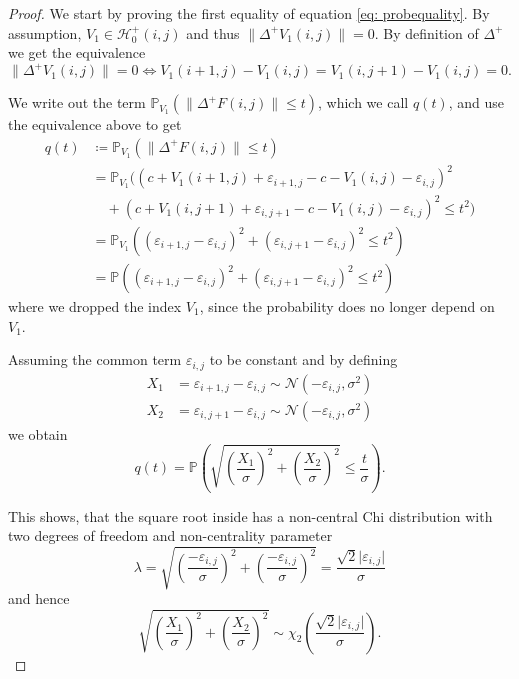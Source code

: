 \documentclass[a4paper,12pt]{article}
\newcommand{\abs}[1]{\lvert#1\rvert}
\newcommand{\norm}[1]{\lVert#1\rVert}
\theoremstyle{plain}
\theoremstyle{definition}
\begin{document}
\begin{proof}
	We start by proving the first equality of equation \eqref{eq: probequality}. By assumption, $V_1 \in \mathcal{H}_0^+(i, j)$ and thus $\norm{\Delta^+ V_1(i, j)} = 0$. By definition of $\Delta^+$ we get the equivalence
	\begin{equation*}
		\norm{\Delta^+ V_1(i, j)} = 0 \Leftrightarrow V_1(i + 1, j) - V_1(i, j) = V_1(i, j + 1) - V_1(i, j) = 0.
	\end{equation*}
	
	We write out the term $\mathbb{P}_{V_1}( \norm{\Delta^+ F(i, j)} \leq t )$, which we call $q(t)$, and use the equivalence above to get
	\begin{align*}
		q(t) &\coloneqq \mathbb{P}_{V_1}( \norm{\Delta^+ F(i, j)} \leq t ) \\
		&= \mathbb{P}_{V_1}\big( (c + V_1(i + 1, j) + \varepsilon_{i + 1, j} - c - V_1(i, j) - \varepsilon_{i, j})^2 \\
		&\quad + (c + V_1(i, j + 1) + \varepsilon_{i, j + 1} - c - V_1(i, j) - \varepsilon_{i, j})^2 \leq t^2 \big) \\
		&= \mathbb{P}_{V_1}\left( (\varepsilon_{i + 1, j} - \varepsilon_{i, j})^2 + (\varepsilon_{i, j + 1} - \varepsilon_{i, j})^2 \leq t^2 \right) \\
		&= \mathbb{P}\left( (\varepsilon_{i + 1, j} - \varepsilon_{i, j})^2 + (\varepsilon_{i, j + 1} - \varepsilon_{i, j})^2 \leq t^2 \right)
	\end{align*}
	where we dropped the index $V_1$, since the probability does no longer depend on $V_1$.
	
	Assuming the common term $\varepsilon_{i, j}$ to be constant and by defining
	\begin{align*}
		X_1 &= \varepsilon_{i + 1, j} - \varepsilon_{i, j} \sim \mathcal{N}(- \varepsilon_{i, j}, \sigma^2) \\
		X_2 &= \varepsilon_{i, j + 1} - \varepsilon_{i, j} \sim \mathcal{N}(- \varepsilon_{i, j}, \sigma^2)
	\end{align*}
	we obtain
	\begin{equation*}
		q(t) = \mathbb{P}\left( \sqrt{\left( \frac{X_1}{\sigma} \right)^2 + \left( \frac{X_2}{\sigma} \right)^2} \leq \frac{t}{\sigma} \right).
	\end{equation*}
	
	This shows, that the square root inside has a non-central Chi distribution with two degrees of freedom and non-centrality parameter
	\begin{equation*}
		\lambda = \sqrt{\left( \frac{- \varepsilon_{i, j}}{\sigma} \right)^2 + \left( \frac{- \varepsilon_{i, j}}{\sigma} \right)^2} = \frac{\sqrt{2} \abs{\varepsilon_{i, j}}}{\sigma}
	\end{equation*}
	and hence
	\begin{equation*}
		\sqrt{\left( \frac{X_1}{\sigma} \right)^2 + \left( \frac{X_2}{\sigma} \right)^2} \sim \chi_2 \left( \frac{\sqrt{2} \abs{\varepsilon_{i, j}}}{\sigma} \right).
	\end{equation*}
	

\end{proof}
\end{document}
